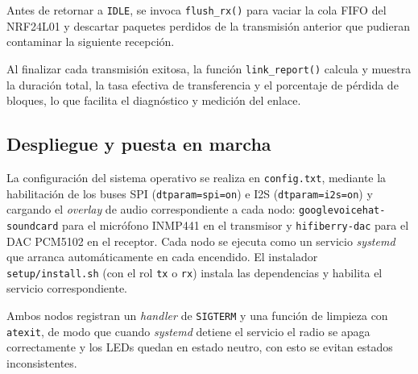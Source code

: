 Antes de retornar a \texttt{IDLE}, se invoca \texttt{flush\_rx()} para vaciar la cola FIFO del NRF24L01 y descartar paquetes perdidos de la transmisión anterior que pudieran contaminar la siguiente recepción.

Al finalizar cada transmisión exitosa, la función \texttt{link\_report()} calcula y muestra la duración total, la tasa efectiva de transferencia y el porcentaje de pérdida de bloques, lo que facilita el diagnóstico y medición del enlace.

\subsection{Despliegue y puesta en marcha}

La configuración del sistema operativo se realiza en \texttt{config.txt}, mediante la habilitación de los buses SPI (\texttt{dtparam=spi=on}) e I2S (\texttt{dtparam=i2s=on}) y cargando el \textit{overlay} de audio correspondiente a cada nodo: \texttt{googlevoicehat-soundcard} para el micrófono INMP441 en el transmisor y \texttt{hifiberry-dac} para el DAC PCM5102 en el receptor.
Cada nodo se ejecuta como un servicio \textit{systemd} que arranca automáticamente en cada encendido.
El instalador \texttt{setup/install.sh} (con el rol \texttt{tx} o \texttt{rx}) instala las dependencias y habilita el servicio correspondiente.

Ambos nodos registran un \textit{handler} de \texttt{SIGTERM} y una función de limpieza con \texttt{atexit}, de modo que cuando \textit{systemd} detiene el servicio el radio se apaga correctamente y los LEDs quedan en estado neutro, con esto se evitan estados inconsistentes.
